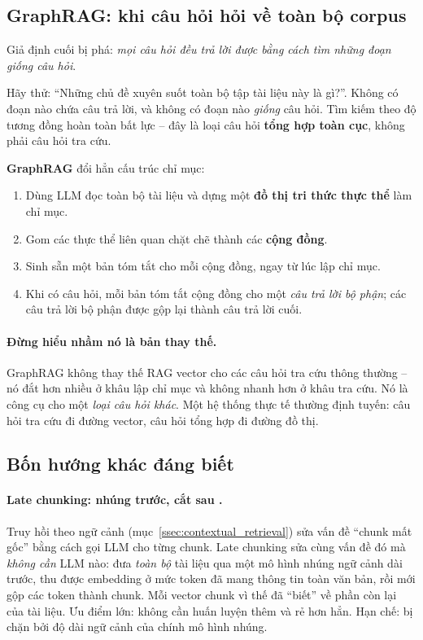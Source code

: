 \subsection{GraphRAG: khi câu hỏi hỏi về toàn bộ corpus}
\label{ssec:graphrag}

Giả định cuối bị phá: \emph{mọi câu hỏi đều trả lời được bằng cách tìm những đoạn giống câu hỏi}.

Hãy thử: “Những chủ đề xuyên suốt toàn bộ tập tài liệu này là gì?”. Không có đoạn nào chứa câu trả lời, và không có đoạn nào \emph{giống} câu hỏi. Tìm kiếm theo độ tương đồng hoàn toàn bất lực -- đây là loại câu hỏi \textbf{tổng hợp toàn cục}, không phải câu hỏi tra cứu.

\textbf{GraphRAG} \cite{edge2024graphrag} đổi hẳn cấu trúc chỉ mục:
\begin{enumerate}
	\item Dùng LLM đọc toàn bộ tài liệu và dựng một \textbf{đồ thị tri thức thực thể} làm chỉ mục.
	\item Gom các thực thể liên quan chặt chẽ thành các \textbf{cộng đồng}.
	\item Sinh sẵn một bản tóm tắt cho mỗi cộng đồng, ngay từ lúc lập chỉ mục.
	\item Khi có câu hỏi, mỗi bản tóm tắt cộng đồng cho một \emph{câu trả lời bộ phận}; các câu trả lời bộ phận được gộp lại thành câu trả lời cuối.
\end{enumerate}

\paragraph{Đừng hiểu nhầm nó là bản thay thế.} GraphRAG không thay thế RAG vector cho các câu hỏi tra cứu thông thường -- nó đắt hơn nhiều ở khâu lập chỉ mục và không nhanh hơn ở khâu tra cứu. Nó là công cụ cho một \emph{loại câu hỏi khác}. Một hệ thống thực tế thường định tuyến: câu hỏi tra cứu đi đường vector, câu hỏi tổng hợp đi đường đồ thị.

\subsection{Bốn hướng khác đáng biết}
\label{ssec:other_rag_variants}

\paragraph{Late chunking: nhúng trước, cắt sau \cite{gunther2024latechunking}.} Truy hồi theo ngữ cảnh (mục~\ref{ssec:contextual_retrieval}) sửa vấn đề “chunk mất gốc” bằng cách gọi LLM cho từng chunk. Late chunking sửa cùng vấn đề đó mà \emph{không cần} LLM nào: đưa \emph{toàn bộ} tài liệu qua một mô hình nhúng ngữ cảnh dài trước, thu được embedding ở mức token đã mang thông tin toàn văn bản, rồi mới gộp các token thành chunk. Mỗi vector chunk vì thế đã “biết” về phần còn lại của tài liệu. Ưu điểm lớn: không cần huấn luyện thêm và rẻ hơn hẳn. Hạn chế: bị chặn bởi độ dài ngữ cảnh của chính mô hình nhúng.

